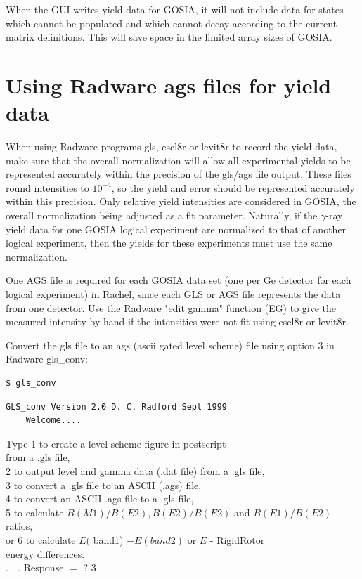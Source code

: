 \documentclass[10pt]{article}
\begin{document}
When the GUI writes yield data for GOSIA, it will not include data for states which cannot be populated and which cannot decay according to the current matrix definitions. This will save space in the limited array sizes of GOSIA.

\section*{Using Radware ags files for yield data}
When using Radware programs gls, escl8r or levit8r to record the yield data, make sure that the overall normalization will allow all experimental yields to be represented accurately within the precision of the gls/ags file output. These files round intensities to $10^{-4}$, so the yield and error should be represented accurately within this precision. Only relative yield intensities are considered in GOSIA, the overall normalization being adjusted as a fit parameter. Naturally, if the $\gamma$-ray yield data for one GOSIA logical experiment are normalized to that of another logical experiment, then the yields for these experiments must use the same normalization.

One AGS file is required for each GOSIA data set (one per Ge detector for each logical experiment) in Rachel, since each GLS or AGS file represents the data from one detector. Use the Radware "edit gamma" function (EG) to give the measured intensity by hand if the intensities were not fit using escl8r or levit8r.

Convert the gls file to an ags (ascii gated level scheme) file using option 3 in Radware gls\_conv:

\begin{verbatim}
$ gls_conv
\end{verbatim}

\begin{verbatim}
GLS_conv Version 2.0 D. C. Radford Sept 1999
    Welcome....
\end{verbatim}

Type 1 to create a level scheme figure in postscript\\
from a .gls file,\\
2 to output level and gamma data (.dat file) from a .gls file,\\
3 to convert a .gls file to an ASCII (.ags) file,\\
4 to convert an ASCII .ags file to a .gls file,\\
5 to calculate $B(M 1) / B(E 2), B(E 2) / B(E 2)$ and $B(E 1) / B(E 2)$ ratios,\\
or 6 to calculate $E($ band1) $-E(b a n d 2)$ or $E$ - RigidRotor\\
energy differences.\\
. . . Response $=$ ? 3
\end{document}
